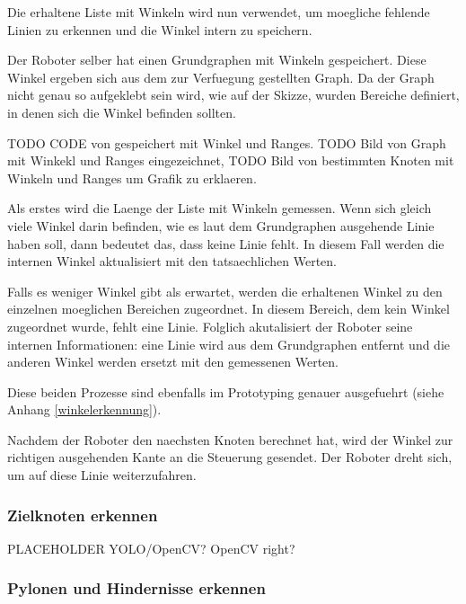 Die erhaltene Liste mit Winkeln wird nun verwendet, um moegliche fehlende Linien zu erkennen und die Winkel intern zu speichern.

Der Roboter selber hat einen Grundgraphen mit Winkeln gespeichert. Diese Winkel ergeben sich aus dem zur Verfuegung gestellten Graph.
Da der Graph nicht genau so aufgeklebt sein wird, wie auf der Skizze, wurden Bereiche definiert, in denen sich die Winkel befinden sollten.

TODO CODE von gespeichert mit Winkel und Ranges. TODO Bild von Graph mit Winkekl und Ranges eingezeichnet, TODO Bild von bestimmten Knoten mit Winkeln und Ranges um Grafik zu erklaeren.

Als erstes wird die Laenge der Liste mit Winkeln gemessen. Wenn sich gleich viele Winkel darin befinden, wie es laut dem Grundgraphen ausgehende Linie haben soll, dann bedeutet das, dass keine Linie fehlt. In diesem Fall werden die internen Winkel aktualisiert mit den tatsaechlichen Werten. 

Falls es weniger Winkel gibt als erwartet, werden die erhaltenen Winkel zu den einzelnen moeglichen Bereichen zugeordnet. In diesem Bereich, dem kein Winkel zugeordnet wurde, fehlt eine Linie. Folglich akutalisiert der Roboter seine internen Informationen: eine Linie wird aus dem Grundgraphen entfernt und die anderen Winkel werden ersetzt mit den gemessenen Werten.

Diese beiden Prozesse sind ebenfalls im Prototyping genauer ausgefuehrt (siehe Anhang \ref{winkelerkennung}).

Nachdem der Roboter den naechsten Knoten berechnet hat, wird der Winkel zur richtigen ausgehenden Kante an die Steuerung gesendet. Der Roboter dreht sich, um auf diese Linie weiterzufahren.

\subsubsection{Zielknoten erkennen}

PLACEHOLDER YOLO/OpenCV? OpenCV right?


\subsubsection{Pylonen und Hindernisse erkennen}


